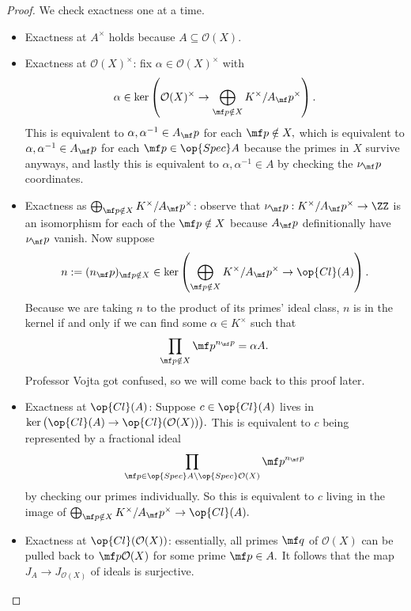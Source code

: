 \documentclass[../notes.tex]{subfiles}
\begin{document}
\begin{proof}
    We check exactness one at a time.
    \begin{itemize}
        \item Exactness at $A^\times$ holds because $A\subseteq\mathcal O(X).$
        \item Exactness at $\mathcal O(X)^\times$: fix $\alpha\in\mathcal O(X)^\times$ with
        \[\alpha\in\ker\left(\mathcal O(X)^\times\to\bigoplus_{\mf p\notin X}K^\times/A_\mf p^\times\right).\]
        This is equivalent to $\alpha,\alpha^{-1}\in A_\mf p$ for each $\mf p\notin X,$ which is equivalent to $\alpha,\alpha^{-1}\in A_\mf p$ for each $\mf p\in\op{Spec}A$ because the primes in $X$ survive anyways, and lastly this is equivalent to $\alpha,\alpha^{-1}\in A$ by checking the $\nu_\mf p$ coordinates.
        \item Exactness as $\bigoplus_{\mf p\notin X}K^\times/A_\mf p^\times$: observe that $\nu_\mf p:K^\times/A_\mf p^\times\to\ZZ$ is an isomorphism for each of the $\mf p\notin X$ because $A_\mf p$ definitionally have $\nu_\mf p$ vanish. Now suppose
        \[n:=(n_\mf p)_{\mf p\notin X}\in\ker\left(\bigoplus_{\mf p\notin X}K^\times/A_\mf p^\times\to\op{Cl}(A)\right).\]
        Because we are taking $n$ to the product of its primes' ideal class, $n$ is in the kernel if and only if we can find some $\alpha\in K^\times$ such that
        \[\prod_{\mf p\notin X}\mf p^{n_\mf p}=\alpha A.\]
        Professor Vojta got confused, so we will come back to this proof later. \todo{}
        \item Exactness at $\op{Cl}(A)$: Suppose $c\in\op{Cl}(A)$ lives in $\ker\big(\op{Cl}(A)\to\op{Cl}(\mathcal O(X))\big).$ This is equivalent to $c$ being represented by a fractional ideal
        \[\prod_{\mf p\in\op{Spec}A\setminus\op{Spec}\mathcal O(X)}\mf p^{n_\mf p}\]
        by checking our primes individually.  So this is equivalent to $c$ living in the image of $\bigoplus_{\mf p\notin X}K^\times/A_\mf p^\times\to\op{Cl}(A).$
        \item Exactness at $\op{Cl}(\mathcal O(X))$: essentially, all primes $\mf q$ of $\mathcal O(X)$ can be pulled back to $\mf p\mathcal O(X)$ for some prime $\mf p\in A.$ It follows that the map $J_A\to J_{\mathcal O(X)}$ of ideals is surjective.
        \qedhere
    \end{itemize}
\end{proof}
\end{document}
